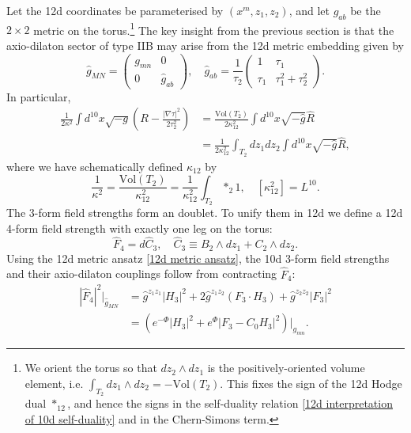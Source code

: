 Let the 12d coordinates be parameterised by $(x^m,z_1,z_2)$, and let $\widehat{g}_{ab}$ be the $2\times 2$ metric on the torus.\footnote{
We orient the torus so that $dz_2\wedge dz_1$ is the positively-oriented volume element, i.e. $\int_{T_2}dz_1\wedge dz_2 = -\mathrm{Vol}(T_2)$. This fixes the sign of the 12d Hodge dual $*_{12}$, and hence the signs in the self-duality relation \eqref{12d interpretation of 10d self-duality} and in the Chern-Simons term.
}
The key insight from the previous section is that the axio-dilaton sector of type IIB may arise from the 12d metric embedding given by
\begin{equation}
\widehat{g}_{MN}=\begin{pmatrix}
g_{mn} & 0 \\
0 &\widehat{g}_{ab}
\end{pmatrix},\quad
\widehat{g}_{ab}
=\frac{1}{\tau_2}\begin{pmatrix}
1& \tau_1\\
\tau_1 & \tau_1^2+\tau_2^2
\end{pmatrix}.
\label{12d metric ansatz}
\end{equation}
In particular,
\begin{equation}
\begin{aligned}
\frac{1}{2\kappa^2}\int d^{10}x\sqrt{-g}\left(
R - \frac{|\nabla \tau|^2}{2\tau_2^2}
\right)
&=
\frac{\mathrm{Vol}(T_2)}{2\kappa_{12}^2}\int d^{10}x \sqrt{-\widehat{g}} \widehat{R}\\
&=\frac{1}{2\kappa_{12}^2}\int_{T_2}dz_1 dz_2\int d^{10}x\sqrt{-\widehat{g}}\widehat{R},
\end{aligned}
\label{axio-dilaton 12d uplift}
\end{equation}
where we have schematically defined $\kappa_{12}$ by 
\begin{equation}
\frac{1}{\kappa^2} = \frac{\mathrm{Vol}(T_2)}{\kappa_{12}^2}
=\frac{1}{\kappa_{12}^2}\int_{T_2}*_2 1,\quad
[\kappa_{12}^2] = L^{10}.
\end{equation}
The 3-form field strengths form an \SLR{} doublet.
To unify them in 12d we define a 12d 4-form field strength with exactly one leg on the torus:
\begin{equation}
\widehat{F}_4=d\widehat C_3,\quad
\widehat C_3 \equiv B_2\wedge dz_1 + C_2\wedge dz_2.
\end{equation}
Using the 12d metric ansatz \eqref{12d metric ansatz}, the 10d 3-form field strengths and their axio-dilaton couplings follow from contracting $\widehat F_4$:
\begin{equation}
\begin{aligned}
|\widehat{F}_4|^2\bigg|_{\widehat{g}_{MN}}
&=\widehat{g}^{z_1 z_1}|H_3|^2+2\widehat{g}^{z_1 z_2}(F_3\cdot H_3)+\widehat{g}^{z_2 z_2}|F_3|^2\\
&=\left(
e^{-\Phi}|H_3|^2 + e^\Phi|F_3-C_0H_3|^2
\right)\bigg|_{g_{mn}}.
\end{aligned}
\end{equation}

